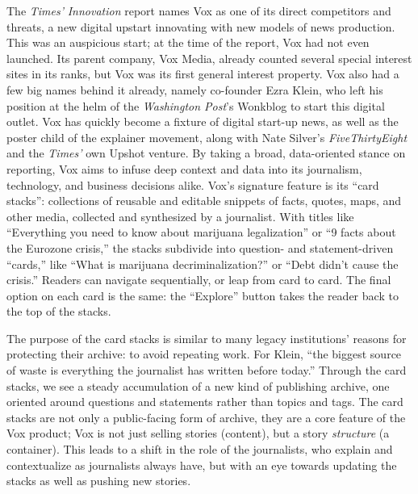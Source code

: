 The \emph{Times'} \emph{Innovation} report names Vox as one of its direct competitors and threats, a new digital upstart innovating with new models of news production. This was an auspicious start; at the time of the report, Vox had not even launched. Its parent company, Vox Media, already counted several special interest sites in its ranks, but Vox was its first general interest property. Vox also had a few big names behind it already, namely co-founder Ezra Klein, who left his position at the helm of the \emph{Washington Post}'s Wonkblog to start this digital outlet. Vox has quickly become a fixture of digital start-up news, as well as the poster child of the explainer movement, along with Nate Silver's \emph{FiveThirtyEight} and the \emph{Times'} own Upshot venture. By taking a broad, data-oriented stance on reporting, Vox aims to infuse deep context and data into its journalism, technology, and business decisions alike. Vox's signature feature is its ``card stacks'': collections of reusable and editable snippets of facts, quotes, maps, and other media, collected and synthesized by a journalist. With titles like ``Everything you need to know about marijuana legalization'' or ``9 facts about the Eurozone crisis,'' the stacks subdivide into question- and statement-driven ``cards,'' like ``What is marijuana decriminalization?'' or ``Debt didn't cause the crisis.'' Readers can navigate sequentially, or leap from card to card. The final option on each card is the same: the ``Explore'' button takes the reader back to the top of the stacks.

The purpose of the card stacks is similar to many legacy institutions' reasons for protecting their archive: to avoid repeating work. For Klein, ``the biggest source of waste is everything the journalist has written before today.''\autocite{kaufman_vox_2014} Through the card stacks, we see a steady accumulation of a new kind of publishing archive, one oriented around questions and statements rather than topics and tags. The card stacks are not only a public-facing form of archive, they are a core feature of the Vox product; Vox is not just selling stories (content), but a story \emph{structure} (a container). This leads to a shift in the role of the journalists, who explain and contextualize as journalists always have, but with an eye towards updating the stacks as well as pushing new stories.

